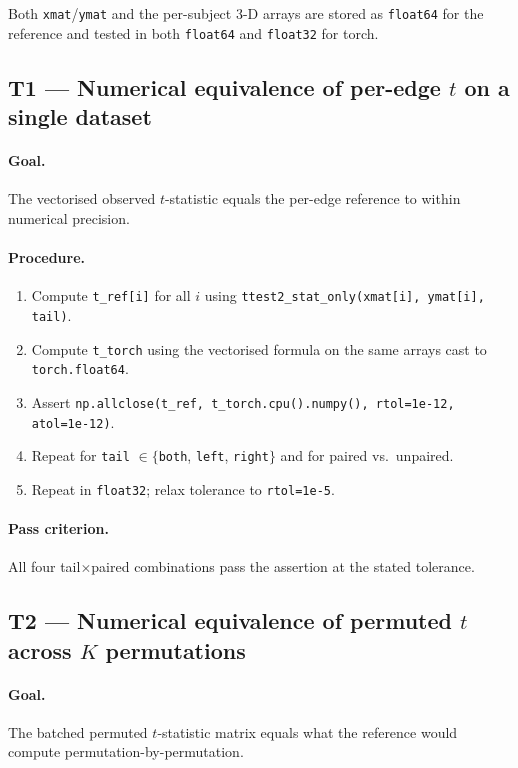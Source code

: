 \documentclass[11pt]{article}
\begin{document}
Both \texttt{xmat}/\texttt{ymat} and the per-subject 3-D arrays are stored as \texttt{float64} for the reference and tested in both \texttt{float64} and \texttt{float32} for torch.

\subsection{T1 --- Numerical equivalence of per-edge $t$ on a single dataset}

\paragraph{Goal.} The vectorised observed $t$-statistic equals the per-edge reference to within numerical precision.

\paragraph{Procedure.}
\begin{enumerate}[leftmargin=2.0em]
\item Compute \texttt{t\_ref[i]} for all $i$ using \texttt{ttest2\_stat\_only(xmat[i], ymat[i], tail)}.
\item Compute \texttt{t\_torch} using the vectorised formula on the same arrays cast to \texttt{torch.float64}.
\item Assert \texttt{np.allclose(t\_ref, t\_torch.cpu().numpy(), rtol=1e-12, atol=1e-12)}.
\item Repeat for \texttt{tail} $\in \{$\texttt{both}, \texttt{left}, \texttt{right}$\}$ and for paired vs.\ unpaired.
\item Repeat in \texttt{float32}; relax tolerance to \texttt{rtol=1e-5}.
\end{enumerate}

\paragraph{Pass criterion.} All four tail$\times$paired combinations pass the assertion at the stated tolerance.

\subsection{T2 --- Numerical equivalence of permuted $t$ across $K$ permutations}

\paragraph{Goal.} The batched permuted $t$-statistic matrix equals what the reference would compute permutation-by-permutation.
\end{document}
